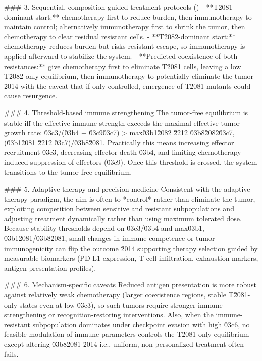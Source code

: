 \documentclass[10pt]{article}
\begin{document}
\begin{AnswerText}
### 3. Sequential, composition-guided treatment protocols ()
- **T\u2081-dominant start:** chemotherapy first to reduce burden, then immunotherapy to maintain control; alternatively immunotherapy first to shrink the tumor, then chemotherapy to clear residual resistant cells.
- **T\u2082-dominant start:** chemotherapy reduces burden but risks resistant escape, so immunotherapy is applied afterward to stabilize the system.
- **Predicted coexistence of both resistances:** give chemotherapy first to eliminate T\u2081 cells, leaving a low T\u2082-only equilibrium, then immunotherapy to potentially eliminate the tumor \u2014 with the caveat that if only controlled, emergence of T\u2081 mutants could cause resurgence.

### 4. Threshold-based immune strengthening
The tumor-free equilibrium is stable iff the effective immune strength exceeds the maximal effective tumor growth rate:
\u03c3/(\u03b4 + \u03c9\u03c7) > max{\u03b1\u2082 \u2212 \u03b8\u2082\u03c7, (\u03b1\u2081 \u2212 \u03c7)/\u03b8\u2081}.
Practically this means increasing effector recruitment \u03c3, decreasing effector death \u03b4, and limiting chemotherapy-induced suppression of effectors (\u03c9). Once this threshold is crossed, the system transitions to the tumor-free equilibrium.

### 5. Adaptive therapy and precision medicine
Consistent with the adaptive-therapy paradigm, the aim is often to *control* rather than eliminate the tumor, exploiting competition between sensitive and resistant subpopulations and adjusting treatment dynamically rather than using maximum tolerated dose. Because stability thresholds depend on \u03c3/\u03b4 and max{\u03b1, \u03b1\u2081/\u03b8\u2081}, small changes in immune competence or tumor immunogenicity can flip the outcome \u2014 supporting therapy selection guided by measurable biomarkers (PD-L1 expression, T-cell infiltration, exhaustion markers, antigen presentation profiles).

### 6. Mechanism-specific caveats
Reduced antigen presentation is more robust against relatively weak chemotherapy (larger coexistence regions, stable T\u2081-only states even at low \u03c3), so such tumors require stronger immune-strengthening or recognition-restoring interventions. Also, when the immune-resistant subpopulation dominates under checkpoint evasion with high \u03c6, no feasible modulation of immune parameters controls the T\u2081-only equilibrium except altering \u03b8\u2081 \u2014 i.e., uniform, non-personalized treatment often fails.
\end{AnswerText}
\end{document}
